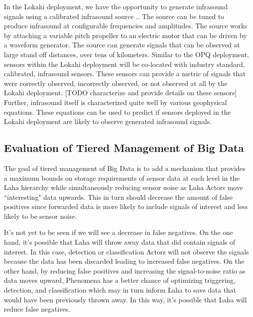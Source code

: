 In the Lokahi deployment, we have the opportunity to generate infrasound signals using a calibrated infrasound source \cite{park2009rotary}.. The source can be tuned to produce infrasound at configurable frequencies and amplitudes. The source works by attaching a variable pitch propeller to an electric motor that can be driven by a waveform generator. The source can generate signals that can be observed at large stand off distances, over tens of kilometers. Similar to the OPQ deployment, sensors within the Lokahi deployment will be co-located with industry standard, calibrated, infrasound sensors. These sensors can provide a metric of signals that were correctly observed, incorrectly observed, or not observed at all by the Lokahi deployment. [TODO characterize and provide details on these sensors] Further, infrasound itself is characterized quite well by various geophysical equations. These equations can be used to predict if sensors deployed in the Lokahi deployment are likely to observe generated infrasound signals.

\subsection{Evaluation of Tiered Management of Big Data}\label{eval-big-data}
The goal of tiered management of Big Data is to add a mechanism that provides a maximum bounds on storage requirements of sensor data at each level in the Laha hierarchy while simultaneously reducing sensor noise as Laha Actors move ``interesting" data upwards. This in turn should decrease the amount of false positives since forwarded data is more likely to include signals of interest and less likely to be sensor noise. 

It's not yet to be seen if we will see a decrease in false negatives. On the one hand, it's possible that Laha will throw away data that did contain signals of interest. In this case, detection or classification Actors will not observe the signals because the data has been discarded leading to increased false negatives. On the other hand, by reducing false positives and increasing the signal-to-noise ratio as data moves upward, Phenomena has a better chance of optimizing triggering, detection, and classification which may in turn inform Laha to save data that would have been previously thrown away. In this way, it's possible that Laha will reduce false negatives.

